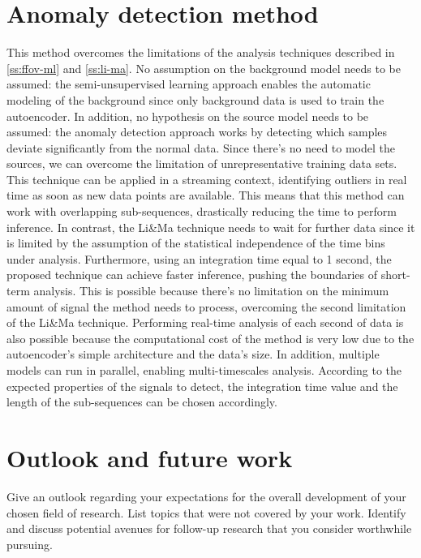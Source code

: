 \section{Anomaly detection method}
\label{c:conclusions}
This method overcomes the limitations of the analysis techniques described in \autoref{ss:ffov-ml} and \autoref{ss:li-ma}. No assumption on the background model needs to be assumed: the semi-unsupervised learning approach enables the automatic modeling of the background since only background data is used to train the autoencoder. In addition, no hypothesis on the source model needs to be assumed: the anomaly detection approach works by detecting which samples deviate significantly from the normal data. Since there's no need to model the sources, we can overcome the limitation of unrepresentative training data sets. This technique can be applied in a streaming context, identifying outliers in real time as soon as new data points are available. This means that this method can work with overlapping sub-sequences, drastically reducing the time to perform inference. In contrast, the Li\&Ma technique needs to wait for further data since it is limited by the assumption of the statistical independence of the time bins under analysis. Furthermore, using an integration time equal to 1 second, the proposed technique can achieve faster inference, pushing the boundaries of short-term analysis. This is possible because there's no limitation on the minimum amount of signal the method needs to process, overcoming the second limitation of the Li\&Ma technique. Performing real-time analysis of each second of data is also possible because the computational cost of the method is very low due to the autoencoder's simple architecture and the data's size. In addition, multiple models can run in parallel, enabling multi-timescales analysis. According to the expected properties of the signals to detect, the integration time value and the length of the sub-sequences can be chosen accordingly. 


\section{Outlook and future work}
Give an outlook regarding your expectations for the overall development of your chosen field of research. List topics that were not covered by your work. Identify and discuss potential avenues for follow-up research that you consider worthwhile pursuing.